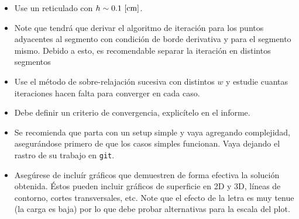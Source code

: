 \documentclass[letter, 11pt]{article}
\begin{document}
\begin{itemize}

  \item Use un reticulado con $h\sim0.1~{\rm [cm]}$.

  \item Note que tendrá que derivar el algoritmo de iteración para los puntos
    adyacentes al segmento con condición de borde derivativa y para el
    segmento mismo.  Debido a esto, es recomendable separar la iteración en
    distintos segmentos

  \item Use el método de sobre-relajación sucesiva con distintos $w$ y
    estudie cuantas iteraciones hacen falta para converger en cada caso.

  \item Debe definir un criterio de convergencia, explicítelo en el informe.

  \item Se recomienda que parta con un setup simple y vaya agregando
    complejidad, asegurándose primero de que los casos simples funcionan. Vaya
    dejando el rastro de su trabajo en \texttt{git}.

  \item Asegúrese de incluír gráficos que demuestren de forma efectiva la
    solución obtenida. Éstos pueden incluir gráficos de superficie en 2D y
    3D, líneas de contorno, cortes transversales, etc. Note que el efecto de
    la letra es muy tenue (la carga es baja) por lo que debe probar
    alternativas para la escala del plot.

\end{itemize}

\end{document}
